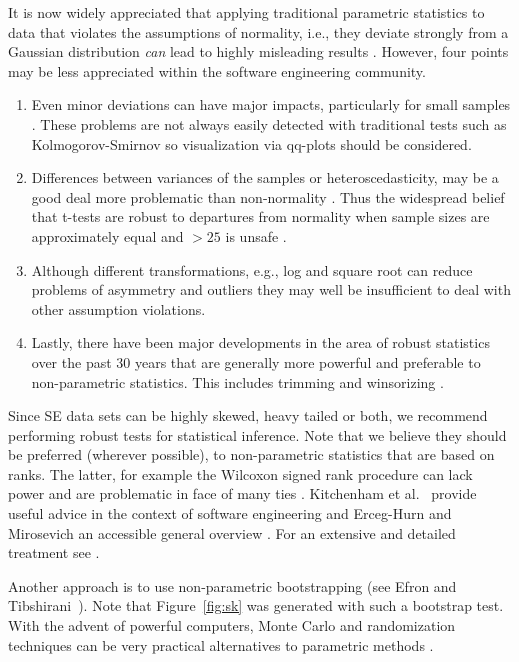 \documentclass[preprint,10pt]{elsarticle}
\newcommand{\RED}{\color{red}}
\newcommand{\BLACK}{\color{black}}
\begin{document}
It is now widely appreciated that applying traditional parametric statistics to data that violates the assumptions of normality, i.e., they deviate strongly from a Gaussian distribution \textit{can} lead to highly misleading results \cite{Kitc02}.  However, four points may be less appreciated within the software engineering community. 
\begin{enumerate}
    \item Even minor deviations can have major impacts, particularly for small samples \cite{Wilc12}.  These problems are not always easily detected with traditional tests such as Kolmogorov-Smirnov so visualization via qq-plots should be considered.
\item Differences between variances of the samples or heteroscedasticity, may be a good deal more problematic than non-normality \cite{Erce08}. Thus the widespread belief that t-tests are robust to departures from normality when sample sizes are approximately equal and $>25$ is unsafe \cite{Erce08,Zimm98}.  
\RED \item Although different transformations, e.g., log and square root can reduce problems of asymmetry and outliers they may well be insufficient to deal with other assumption violations. \BLACK
\item Lastly, there have been major developments in the area of robust statistics over the past 30 years that are generally more powerful and preferable to non-parametric statistics.  This includes trimming and winsorizing \cite{Hoag83,Kitc17}.
\end{enumerate}

Since SE data sets can be highly skewed, heavy tailed or both, \RED we recommend performing robust tests for statistical inference. Note that we believe they should be preferred (wherever possible), to non-parametric statistics that are based on ranks. The latter, \BLACK for example the Wilcoxon signed rank procedure can lack power and are problematic in face of many ties \cite{Blai85}.  Kitchenham et al.~\cite{Kitc17} provide useful advice in the context of software engineering and Erceg-Hurn and Mirosevich an accessible general overview \cite{Erce08}.  For an extensive and detailed treatment see \cite{Wilc12}.  

Another approach is to use non-parametric bootstrapping (see Efron and Tibshirani~\cite[p220-223]{efron93}). Note that  Figure~\ref{fig:sk} was generated with such a bootstrap test.  With the advent of powerful computers, Monte Carlo and randomization techniques can be very practical alternatives to parametric methods \cite{Manl97}.  %
\end{document}
